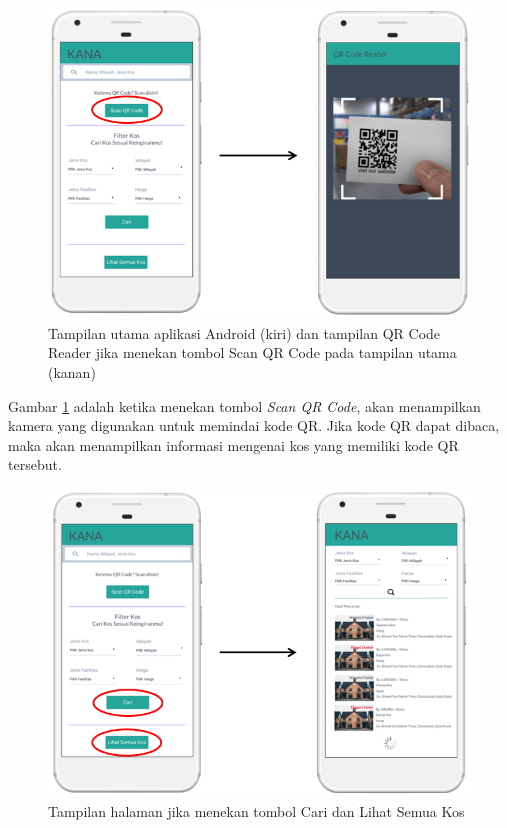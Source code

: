 \begin{enumerate}[a.]
	\begin{figure}[H]
		\centering
		\includegraphics[width=\linewidth]{gambar/and1}
		\caption{Tampilan utama aplikasi Android (kiri) dan tampilan QR Code Reader jika menekan tombol Scan QR Code pada tampilan utama (kanan)}
		\label{android1}
	\end{figure}
	
Gambar \ref{android1} adalah ketika menekan tombol \textit{Scan QR Code}, akan menampilkan kamera yang digunakan untuk memindai kode QR. Jika kode QR dapat dibaca, maka akan menampilkan informasi mengenai kos yang memiliki kode QR tersebut.
	
	\begin{figure}[H]
		\centering
		\includegraphics[width=\linewidth]{gambar/and2}
		\caption{Tampilan halaman jika menekan tombol Cari dan Lihat Semua Kos}
		\label{android2}
	\end{figure}
	

\end{enumerate}
